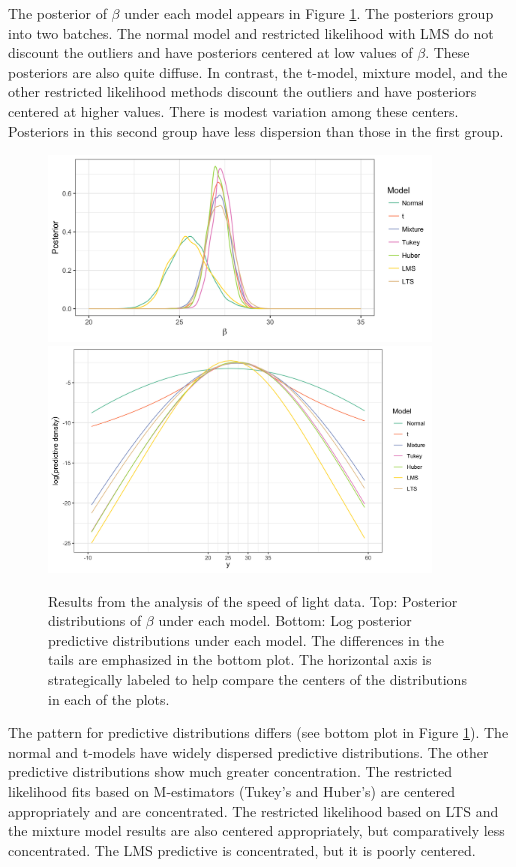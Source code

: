 \documentclass[ba]{imsart}
\begin{document}
The posterior of $\beta$ under each model appears in Figure \ref{fig:newcomb_post}.  The posteriors group into two batches.  The normal model and restricted likelihood with LMS do not discount the outliers and have posteriors centered at low values of $\beta$.  These posteriors are also quite diffuse.  In contrast, the t-model, mixture model, and the other restricted likelihood methods discount the outliers and have posteriors centered at higher values.  There is modest variation among these centers.  Posteriors in this second group have less dispersion than those in the first group.   
\begin{figure}[t]
\centering
{\includegraphics[width = 4in]{figs/speed_of_light_beta.png}}
{\includegraphics[width = 4in]{figs/speed_of_light_predictive.png}}
\caption{Results from the analysis of the speed of light data. Top: Posterior distributions of $\beta$ under each model. Bottom: Log posterior predictive distributions under each model. The differences in the tails are emphasized in the bottom plot. The horizontal axis is strategically labeled to help compare the centers of the distributions in each of the plots.}
\label{fig:newcomb_post}
\end{figure}
The pattern for predictive distributions differs (see bottom plot in Figure \ref{fig:newcomb_post}).  The normal and t-models have widely dispersed predictive distributions.  The other predictive distributions show much greater concentration.  The restricted likelihood fits based on M-estimators (Tukey's and Huber's) are centered appropriately and are concentrated. The restricted likelihood based on LTS and the mixture model results are also centered appropriately, but comparatively less concentrated. The LMS predictive is concentrated, but it is poorly centered.  
\end{document}
